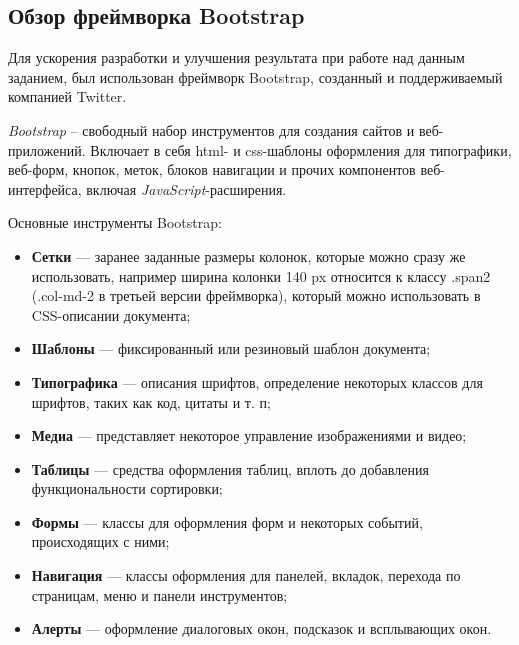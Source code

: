 \subsection{Обзор фреймворка Bootstrap}\label{theory:bootstrap}

Для ускорения разработки и улучшения результата при работе над данным заданием, был использован фреймворк Bootstrap, созданный и поддерживаемый компанией Twitter.

\textit{Bootstrap} -- свободный набор инструментов для создания сайтов и веб-приложений. Включает в себя \gls{html}- и \gls{css}-шаблоны оформления для типографики, веб-форм, кнопок, меток, блоков навигации и прочих компонентов веб-интерфейса, включая \textit{JavaScript}-расширения\cite{wiki:bootstrap}. 

Основные инструменты Bootstrap:
\begin{itemize}
	\item \textbf{Сетки} — заранее заданные размеры колонок, которые можно сразу же использовать, например ширина колонки 140 px относится к классу .span2 (.col-md-2 в третьей версии фреймворка), который можно использовать в CSS-описании документа;
	\item \textbf{Шаблоны} — фиксированный или резиновый шаблон документа;
	\item \textbf{Типографика} — описания шрифтов, определение некоторых классов для шрифтов, таких как код, цитаты и т. п;
	\item \textbf{Медиа} — представляет некоторое управление изображениями и видео;
	\item \textbf{Таблицы} — средства оформления таблиц, вплоть до добавления функциональности сортировки;
	\item \textbf{Формы} — классы для оформления форм и некоторых событий, происходящих с ними;
	\item \textbf{Навигация} — классы оформления для панелей, вкладок, перехода по страницам, меню и панели инструментов;
	\item \textbf{Алерты} — оформление диалоговых окон, подсказок и всплывающих окон.
\end{itemize}

